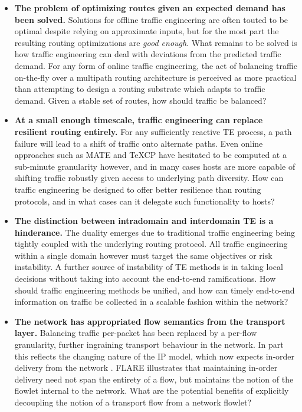 \begin{itemize}
\item{
    \textbf{The problem of optimizing routes given an expected demand has been solved.}
    Solutions for offline traffic engineering \cite{Fortz:2000p350,YufeiWang:1999p222,Wang:2001p506} are often touted to be optimal despite relying on approximate inputs, but for the most part the resulting routing optimizations are \emph{good enough}. 
    What remains to be solved is how traffic engineering can deal with deviations from the predicted traffic demand.
    For any form of online traffic engineering, the act of balancing traffic on-the-fly over a multipath routing architecture is perceived as more practical than attempting to design a routing substrate which adapts to traffic demand.
    Given a stable set of routes, how should traffic be balanced?
}

\item{
    \textbf{At a small enough timescale, traffic engineering can replace resilient routing entirely.}
    For any sufficiently reactive \ac{TE} process, a path failure will lead to a shift of traffic onto alternate paths. 
    Even online approaches such as MATE and TeXCP have hesitated to be computed at a sub-minute granularity however, and in many cases hosts are more capable of shifting traffic robustly given access to underlying path diversity.
    How can traffic engineering be designed to offer better resilience than routing protocols, and in what cases can it delegate such functionality to hosts?
}

\item{
    \textbf{The distinction between intradomain and interdomain \ac{TE} is a hinderance.}
    The duality emerges due to traditional traffic engineering being tightly coupled with the underlying routing protocol.
    All traffic engineering within a single domain however must target the same objectives or risk instability.
    A further source of instability of \ac{TE} methods is in taking local decisions without taking into account the end-to-end ramifications.
    How should traffic engineering methods be unified, and how can timely end-to-end information on traffic be collected in a scalable fashion within the network?
}

\item{
    \textbf{The network has appropriated flow semantics from the transport layer.}
    Balancing traffic per-packet has been replaced by a per-flow granularity, further ingraining transport behaviour in the network.
    In part this reflects the changing nature of the \ac{IP} model, which now expects in-order delivery from the network \cite{Thaler:2010p223}.
    FLARE \cite{Sinha:2004p124} illustrates that maintaining in-order delivery need not span the entirety of a flow, but maintains the notion of the flowlet internal to the network.
    What are the potential benefits of explicitly decoupling the notion of a transport flow from a network flowlet?
}
\end{itemize}


